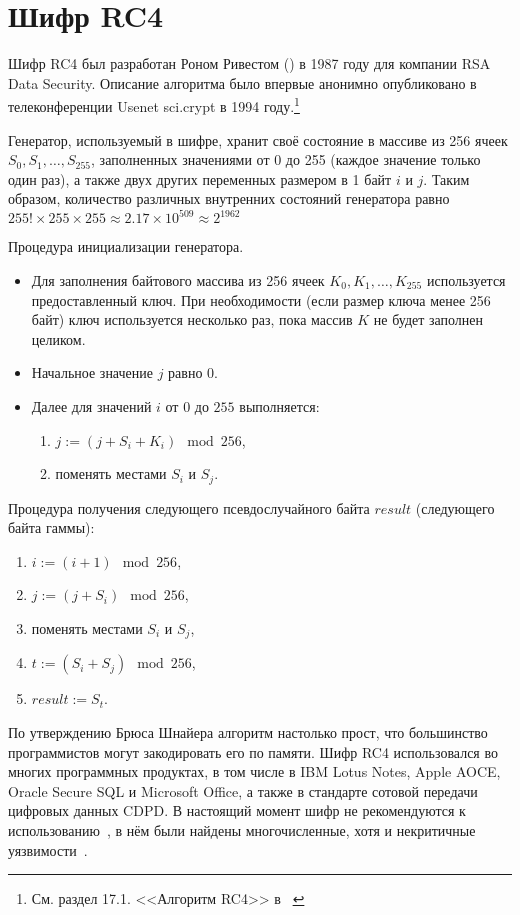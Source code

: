 \section{Шифр RC4}\label{rc4}

Шифр RC4 был разработан Роном Ривестом () в 1987 году для компании RSA Data Security. Описание алгоритма было впервые анонимно опубликовано в телеконференции Usenet sci.crypt в 1994 году.\footnote{См. раздел 17.1. <<Алгоритм RC4>> в ~\cite{Schneier:2002}}

Генератор, используемый в шифре, хранит своё состояние в массиве из 256 ячеек $S_0, S_1, \dots, S_{255}$, заполненных значениями от 0 до 255 (каждое значение только один раз), а также двух других переменных размером в 1 байт $i$ и $j$. Таким образом, количество различных внутренних состояний генератора равно $255! \times 255 \times 255 \approx 2.17 \times 10^{509} \approx 2^{1962}$

Процедура инициализации генератора.
\begin{itemize}
	\item Для заполнения байтового массива из 256 ячеек $K_0, K_1, \dots, K_{255}$ используется предоставленный ключ. При необходимости (если размер ключа менее 256 байт) ключ используется несколько раз, пока массив $K$ не будет заполнен целиком.
	\item Начальное значение $j$ равно $0$.
	\item Далее для значений $i$ от $0$ до $255$ выполняется:
	\begin{enumerate}
		\item $j:= (j + S_i + K_i) \mod 256$,
		\item поменять местами $S_i$ и $S_j$.
	\end{enumerate}
\end{itemize}

Процедура получения следующего псевдослучайного байта $result$ (следующего байта гаммы):
\begin{enumerate}
	\item $ i := (i + 1) \mod 256$,
	\item $ j := (j + S_i) \mod 256$,
	\item поменять местами $S_i$ и $S_j$,
	\item $ t := ( S_i + S_j ) \mod 256$,
	\item $ result := S_t$.
\end{enumerate}

По утверждению Брюса Шнайера алгоритм настолько прост, что большинство программистов могут закодировать его по памяти. Шифр RC4 использовался во многих программных продуктах, в том числе в IBM Lotus Notes, Apple AOCE, Oracle Secure SQL и Microsoft Office, а также в стандарте сотовой передачи цифровых данных CDPD. В настоящий момент шифр не рекомендуются к использованию~\cite{rfc7465}, в нём были найдены многочисленные, хотя и некритичные уязвимости~\cite{Fluhrer:Mantin:Shamir:2001,Mantin:Shamir:2002,Paul:Maitra:2007,Sepehrdad:Vaudenay:Vuagnoux:2011}.

